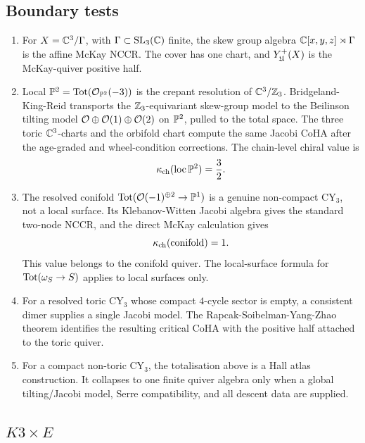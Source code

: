 \subsection*{Boundary tests}

\begin{enumerate}
\item For \(X=\mathbb C^3/\Gamma\), with
\(\Gamma\subset\mathrm{SL}_3(\mathbb C)\) finite, the skew group algebra
\(\mathbb C[x,y,z]\rtimes\Gamma\) is the affine McKay NCCR.  The cover has
one chart, and \(Y^{+}_{\mathfrak U}(X)\) is the McKay-quiver positive half.

\item Local \(\mathbb P^2=\operatorname{Tot}(\mathcal O_{\mathbb P^2}(-3))\) is the crepant resolution of
\(\mathbb C^3/\mathbb Z_3\).  Bridgeland-King-Reid transports the
\(\mathbb Z_3\)-equivariant skew-group model to the Beilinson tilting model
\(\mathcal O\oplus\mathcal O(1)\oplus\mathcal O(2)\) on \(\mathbb P^2\), pulled to the total
space.  The three toric \(\mathbb C^3\)-charts and the orbifold chart compute
the same Jacobi CoHA after the age-graded and wheel-condition
corrections.  The chain-level chiral value is
\[
  \kappa_{\mathrm{ch}}(\mathrm{loc}\,\mathbb P^2)=\frac32 .
\]

\item The resolved conifold
\(\operatorname{Tot}(\mathcal O(-1)^{\oplus2}\to\mathbb P^1)\) is a genuine non-compact
CY$_3$, not a local surface.  Its Klebanov-Witten Jacobi algebra gives
the standard two-node NCCR, and the direct McKay calculation gives
\[
  \kappa_{\mathrm{ch}}(\mathrm{conifold})=1 .
\]
This value belongs to the conifold quiver.  The local-surface formula
for \(\operatorname{Tot}(\omega_S\to S)\) applies to local surfaces only.

\item For a resolved toric CY$_3$ whose compact \(4\)-cycle sector is
empty, a consistent dimer supplies a single Jacobi model.  The
Rapcak-Soibelman-Yang-Zhao theorem identifies the resulting critical
CoHA with the positive half attached to the toric quiver.

\item For a compact non-toric CY$_3$, the totalisation above is a Hall
atlas construction.  It collapses to one finite quiver algebra only when
a global tilting/Jacobi model, Serre compatibility, and all descent data
are supplied.
\end{enumerate}

\subsection*{\texorpdfstring{$K3\times E$}{K3 x E}}

